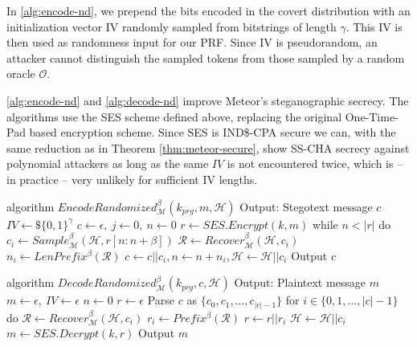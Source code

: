In \autoref{alg:encode-nd}, we prepend the bits encoded in the covert distribution with an initialization vector IV randomly sampled from bitstrings of length $\gamma$.
This IV is then used as randomness input for our PRF.
Since IV is pseudorandom, an attacker cannot distinguish the sampled tokens from those sampled by a random oracle $\mathcal{O}$.

\autoref{alg:encode-nd} and \autoref{alg:decode-nd} improve Meteor's steganographic secrecy.
The algorithms use the SES scheme defined above, replacing the original One-Time-Pad based encryption scheme.
Since SES is IND\$-CPA secure we can, with the same reduction as in Theorem \ref{thm:meteor-secure}, show SS-CHA secrecy against polynomial attackers as long as the same $IV$ is not encountered twice, which is -- in practice -- very unlikely for sufficient IV lengths.


\begin{Pseudocode}[float, caption={
Meteor EncodeRandomized Algorithm.
This algorithm differs from the original Encode algorithm by using a SES to encrypt the message.
The ciphertext (which is indistinguishable from randomness) is then used to sample from $\mathcal{M}$.
}, label={alg:encode-nd}]
algorithm $EncodeRandomized_{\mathcal{M}}^{\beta}(k_{prg}, m, \mathcal{H})$
	Output: Stegotext message $c$
	$IV \leftarrow\$ \{0,1\}^\gamma$
	$c \leftarrow \epsilon,~ j \leftarrow 0,~ n \leftarrow 0$
	$r \leftarrow SES.Encrypt(k, m)$
	while $n < |r|$ do
		$c_i \leftarrow Sample_{\mathcal{M}}^\beta(\mathcal{H}, r[n: n+\beta])$
		$\mathcal{R} \leftarrow Recover_{\mathcal{M}}^\beta(\mathcal{H}, c_i)$
		$n_i \leftarrow LenPrefix^\beta(\mathcal{R})$
		$c \leftarrow c || c_i, n \leftarrow n+n_i, \mathcal{H} \leftarrow \mathcal{H}||c_i$
	Output $c$
\end{Pseudocode}
\begin{Pseudocode}[float, caption={
Meteor DecodeRandomized Algorithm.
This algorithm differs from the original Decode algorithm by interpreting the first $\gamma$ bits of the hiddentext as IV.
After decoding $\gamma$ bits of hiddentext, a PRF is initialized with IV for generation of pseudorandom masks.}, label={alg:decode-nd}]
algorithm $DecodeRandomized_{\mathcal{M}}^{\beta}(k_{prg}, c, \mathcal{H})$
	Output: Plaintext message $m$
	$m \leftarrow \epsilon,~ IV \leftarrow \epsilon$
	$n \leftarrow 0$
	$r \leftarrow \epsilon$
	Parse $c$ as $\{ c_0, c_1, \dots, c_{|c|-1} \}$
	for $i \in \{0, 1, \dots, |c|-1 \}$ do
		$\mathcal{R} \leftarrow Recover_{\mathcal{M}}^\beta(\mathcal{H}, c_i)$
		$r_i \leftarrow Prefix^\beta(\mathcal{R})$
		$r \leftarrow r || r_i$
		$\mathcal{H} \leftarrow \mathcal{H}||c_i$
	$m \leftarrow SES.Decrypt(k, r)$
	Output $m$
\end{Pseudocode}
